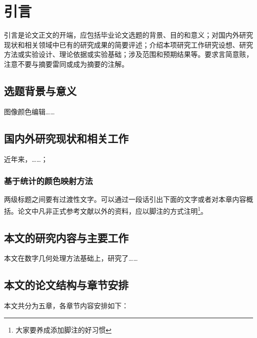 \chapter{引言}
引言是论文正文的开端，应包括毕业论文选题的背景、目的和意义；对国内外研究现状和相关领域中已有的研究成果的简要评述；介绍本项研究工作研究设想、研究方法或实验设计、理论依据或实验基础；涉及范围和预期结果等。要求言简意赅，注意不要与摘要雷同或成为摘要的注解。
\label{cha:introduction}
\section{选题背景与意义}
\label{sec:background}
图像颜色编辑……

\section{国内外研究现状和相关工作}
\label{sec:related_work}
近年来，……；

\subsection{基于统计的颜色映射方法}
两级标题之间要有过渡性文字。可以通过一段话引出下面的文字或者对本章内容概括。论文中凡非正式参考文献以外的资料，应以脚注的方式注明\footnote{大家要养成添加脚注的好习惯}。

\section{本文的研究内容与主要工作}
本文在数字几何处理方法基础上，研究了……

\section{本文的论文结构与章节安排}

\label{sec:arrangement}
本文共分为五章，各章节内容安排如下：


